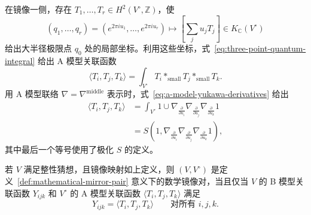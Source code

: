 在镜像一侧，存在 $T_1,\ldots,T_r\in H^2(V^\circ,\mathbb Z)$，使
\[
(q_1,\ldots,q_r)=(e^{2\pi iu_1},\ldots,e^{2\pi iu_r})
\longmapsto\left[\sum_ju_jT_j\right]\in K_{\mathbb C}(V^\circ)
\]
给出大半径极限点 $q_0$ 处的局部坐标。利用这些坐标，式~\eqref{eq:three-point-quantum-integral} 给出 A 模型关联函数
\begin{equation}\label{eq:a-model-mirror-correlations}
\langle T_i,T_j,T_k\rangle=\int_{V^\circ}T_i*_{\mathrm{small}}T_j*_{\mathrm{small}}T_k.
\end{equation}
用 A 模型联络 $\nabla=\nabla^{\mathrm{middle}}$ 表示时，式~\eqref{eq:a-model-yukawa-derivatives} 给出
\begin{equation}\label{eq:a-model-correlations-polarization}
\begin{aligned}
\langle T_i,T_j,T_k\rangle
&=\int_{V^\circ}1\cup\nabla_{\frac{\partial}{\partial u_i}}\nabla_{\frac{\partial}{\partial u_j}}\nabla_{\frac{\partial}{\partial u_k}}1\\
&=S\left(1,\nabla_{\frac{\partial}{\partial u_i}}\nabla_{\frac{\partial}{\partial u_j}}\nabla_{\frac{\partial}{\partial u_k}}1\right),
\end{aligned}
\end{equation}
其中最后一个等号使用了极化 $S$ 的定义。
\begin{theorem}\label{thm:mirror-correlation-equivalence}
若 $V$ 满足整性猜想，且镜像映射如上定义，则 $(V,V^\circ)$ 是定义~\ref{def:mathematical-mirror-pair} 意义下的数学镜像对，当且仅当 $V$ 的 B 模型关联函数 $Y_{ijk}$ 和 $V^\circ$ 的 A 模型关联函数 $\langle T_i,T_j,T_k\rangle$ 满足
\[
Y_{ijk}=\langle T_i,T_j,T_k\rangle\qquad\text{对所有 }i,j,k.
\]
\end{theorem}
